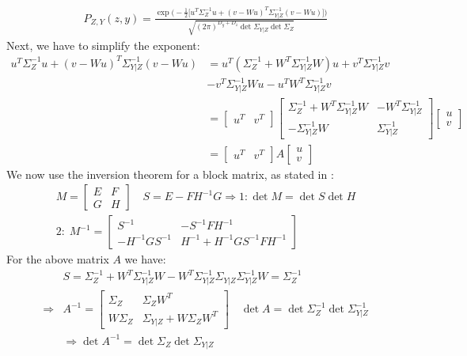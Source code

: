 \documentclass[11pt,a4paper]{article}
\begin{document}
\begin{align}\label{eq1}
P_{Z,Y}(z,y)=\frac{ \exp \Big(-\frac{1}{2}\big[u^T\Sigma_{Z}^{-1} u+(v-Wu)^T\Sigma_{Y|Z}^{-1}(v-Wu)\big]\Big) }{\sqrt{(2\pi)^{D_y+D_z}\det \Sigma_{Y|Z} \det \Sigma_{Z}}}
\end{align}
Next, we have to simplify the exponent: 
\begin{equation} \label{simplify}
\begin{split}
u^T\Sigma_{Z}^{-1} u+(v-Wu)^T\Sigma_{Y|Z}^{-1}(v-Wu)&=u^T(\Sigma_{Z}^{-1}+W^T\Sigma_{Y|Z}^{-1}W)u+v^T\Sigma_{Y|Z}^{-1}v\\
&-v^T\Sigma_{Y|Z}^{-1}Wu-u^TW^T\Sigma_{Y|Z}^{-1}v\\
&=\begin{bmatrix}
u^T & v^T
\end{bmatrix}
\begin{bmatrix}
\Sigma_{Z}^{-1}+W^T\Sigma_{Y|Z}^{-1}W & -W^T\Sigma_{Y|Z}^{-1} \\
-\Sigma_{Y|Z}^{-1}W & \Sigma_{Y|Z}^{-1}
\end{bmatrix}
\begin{bmatrix}
u \\ v
\end{bmatrix}\\
&=
\begin{bmatrix} u^T & v^T \end{bmatrix}
A
\begin{bmatrix} u \\ v \end{bmatrix}
\end{split}
\end{equation}
We now use the inversion theorem for a block matrix, as stated in \cite{Murphy}:
\begin{equation} 
\begin{split}
M=\begin{bmatrix}
E &F \\
G& H
\end{bmatrix}
\quad S=E-FH^{-1}G \Rightarrow 1:\det M=\det S \det H
\\
2:\;M^{-1}=\begin{bmatrix}
S^{-1} &-S^{-1}FH^{-1} \\
-H^{-1}GS^{-1} & H^{-1}+H^{-1}GS^{-1}FH^{-1}
\end{bmatrix}
\end{split}
\end{equation}
For the above matrix $A$ we have:
\begin{equation} 
\begin{split}
&S=\Sigma_{Z}^{-1}+W^T\Sigma_{Y|Z}^{-1}W-W^T\Sigma_{Y|Z}^{-1}\Sigma_{Y|Z}\Sigma_{Y|Z}^{-1}W=\Sigma_{Z}^{-1}\\
\Rightarrow & \boxed{A^{-1}=
\begin{bmatrix}
\Sigma_Z & \Sigma_ZW^T \\
W\Sigma_Z & \Sigma_{Y|Z}+W\Sigma_ZW^T
\end{bmatrix} }
\quad \det A=\det \Sigma_Z^{-1} \det \Sigma_{Y|Z}^{-1}\\
&\Rightarrow \det A^{-1}=\det \Sigma_Z \det \Sigma_{Y|Z}
\end{split}
\end{equation}
\end{document}
